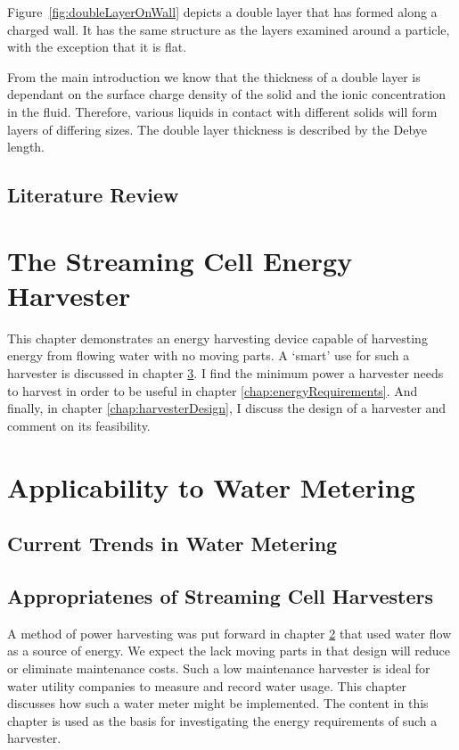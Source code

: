     Figure~\ref{fig:doubleLayerOnWall} depicts a double layer that has formed along a charged wall.
    It has the same structure as the layers examined around a particle, with the exception that it is flat.

    From the main introduction we know that the thickness of a double layer is dependant on the surface charge density of the solid and the ionic concentration in the fluid.
    Therefore, various liquids in contact with different solids will form layers of differing sizes.
    The double layer thickness is described by the Debye length.






  \section{Literature Review}

\chapter{The Streaming Cell Energy Harvester}
  \label{chap:harvestingEnergy}

  This chapter demonstrates an energy harvesting device capable of harvesting energy from flowing water with no moving parts.
  A `smart' use for such a harvester is discussed in chapter \ref{chap:wirelessWaterMetering}.
  I find the minimum power a harvester needs to harvest in order to be useful in chapter \ref{chap:energyRequirements}.
  And finally, in chapter \ref{chap:harvesterDesign}, I discuss the design of a harvester and comment on its feasibility.

  

\chapter{Applicability to Water Metering}
  \label{chap:wirelessWaterMetering}
  \section{Current Trends in Water Metering}
  \section{Appropriatenes of Streaming Cell Harvesters}

  A method of power harvesting was put forward in chapter \ref{chap:harvestingEnergy} that used water flow as a source of energy.
  We expect the lack moving parts in that design will reduce or eliminate maintenance costs.
  Such a low maintenance harvester is ideal for water utility companies to measure and record water usage.
  This chapter discusses how such a water meter might be implemented.
  The content in this chapter is used as the basis for investigating the energy requirements of such a harvester.
  

